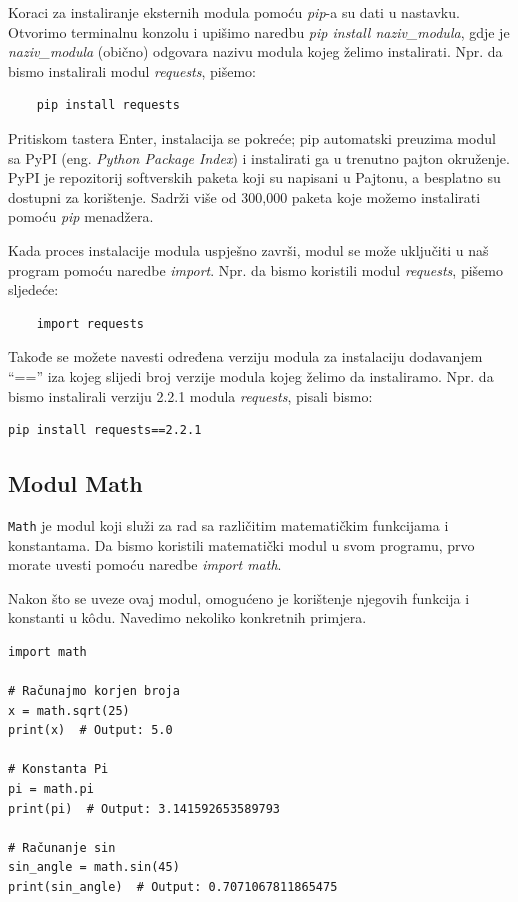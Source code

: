Koraci za instaliranje eksternih modula pomoću \emph{pip}-a su dati u nastavku. Otvorimo terminalnu konzolu i upišimo naredbu \textit{pip install naziv\_modula}, gdje je \textit{naziv\_modula} (obično) odgovara nazivu  modula kojeg želimo instalirati. Npr. da bismo instalirali modul \textit{requests}, pišemo:
\begin{verbatim}
    pip install requests
\end{verbatim}

Pritiskom tastera Enter, instalacija se pokreće; pip automatski preuzima modul sa PyPI (eng. \textit{Python Package Index}) i instalirati ga u trenutno pajton okruženje. PyPI je repozitorij softverskih paketa koji su napisani u Pajtonu, a besplatno su dostupni za korištenje. Sadrži više od 300,000 paketa koje možemo instalirati pomoću \textit{pip} menadžera.


Kada proces instalacije modula uspješno završi, modul se može uključiti u naš program pomoću naredbe \textit{import}. Npr. da bismo koristili modul \textit{requests}, pišemo sljedeće:
\begin{verbatim}
    import requests
\end{verbatim}
Takođe se možete navesti određena verziju modula za instalaciju dodavanjem  ``==''  iza kojeg slijedi broj verzije modula kojeg želimo da instaliramo. Npr. da bismo instalirali verziju 2.2.1 modula \textit{requests},  pisali bismo:
\begin{verbatim}
pip install requests==2.2.1
\end{verbatim}


\subsection{Modul Math}

\texttt{Math} je modul koji služi za rad sa različitim matematičkim funkcijama i konstantama. Da bismo koristili matematički modul u svom programu, prvo morate uvesti pomoću naredbe \textit{import math}.

Nakon što se uveze ovaj modul, omogućeno je korištenje njegovih funkcija i konstanti u k\^odu. Navedimo nekoliko konkretnih primjera. 

\begin{verbatim}
import math

# Računajmo korjen broja
x = math.sqrt(25)
print(x)  # Output: 5.0

# Konstanta Pi
pi = math.pi
print(pi)  # Output: 3.141592653589793

# Računanje sin 
sin_angle = math.sin(45)
print(sin_angle)  # Output: 0.7071067811865475
\end{verbatim}

